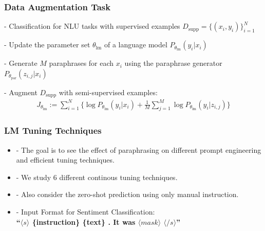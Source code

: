 \documentclass{beamer}
\begin{document}
\begin{frame}
\frametitle{Data Augmentation Task}
 - Classification for NLU tasks with supervised examples $D_{\text{supp}} = \{(x_i, y_i)\}_{i=1}^{N}$

 \medskip
 \medskip
 \medskip
 
 - Update the parameter set $\theta_{\text{lm}}$ of a language model $P_{\theta_{\text{lm}}} (y_i | x_i)$

 \medskip
 \medskip
 \medskip

 - Generate $M$ paraphrases for each $x_i$ using the paraphrase generator $P_{\theta_{\text{par}}} (z_{i,j} | x_i)$

 \medskip
 \medskip
 \medskip

 - Augment $D_{\text{supp}}$ with semi-supervised examples:
\begin{multline}
J_{\theta_{\text{lm}}} := \sum_{i=1}^{N} \{\log P_{\theta_{\text{lm}}} (y_i | x_i) + \frac{1}{M} \sum_{j=1}^{M} \log P_{\theta_{\text{lm}}} (y_i | z_{i,j})\}
\label{lmfp-augmentation-objective}
\end{multline}

\end{frame}


\begin{frame}
\frametitle{LM Tuning Techniques}

\begin{itemize}
    \item - The goal is to see the effect of paraphrasing on different prompt engineering and efficient tuning techniques.

    \medskip
    \medskip
    \medskip

    \item - We study 6 different continous tuning techniques.

    \medskip
    \medskip
    \medskip

    \item - Also consider the zero-shot prediction using only manual instruction.

    \medskip
    \medskip
    \medskip

    \item - Input Format for Sentiment Classification:\\
    \textbf{``$\langle s \rangle$ \{instruction\} \{text\} . It was $\langle mask \rangle$ $\langle /s \rangle$''}\\
\end{itemize}

\end{frame}
\end{document}
